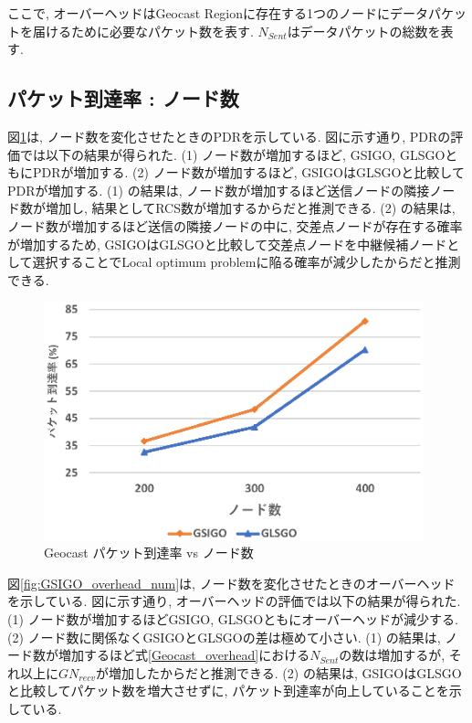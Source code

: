 \documentclass[10pt]{jreport}
\begin{document}
ここで, オーバーヘッドはGeocast Regionに存在する1つのノードにデータパケットを届けるために必要なパケット数を表す.
$N_{Sent}$はデータパケットの総数を表す. 

\subsection{パケット到達率 : ノード数}
図\ref{fig:GSIGO_PDR_num}は, ノード数を変化させたときのPDRを示している.
図に示す通り, PDRの評価では以下の結果が得られた.
(1) ノード数が増加するほど, GSIGO, GLSGOともにPDRが増加する. 
(2) ノード数が増加するほど, GSIGOはGLSGOと比較してPDRが増加する.
(1) の結果は, ノード数が増加するほど送信ノードの隣接ノード数が増加し, 結果としてRCS数が増加するからだと推測できる.
(2) の結果は, ノード数が増加するほど送信の隣接ノードの中に, 交差点ノードが存在する確率が増加するため, GSIGOはGLSGOと比較して交差点ノードを中継候補ノードとして選択することでLocal optimum problemに陥る確率が減少したからだと推測できる.


\begin{figure}[!ht]
	\centering
	\includegraphics[width=110mm]{figures/GSIGO_PDR_num.eps}
	\caption{Geocast パケット到達率 vs ノード数}
	\label{fig:GSIGO_PDR_num}
\end{figure}

図\ref{fig:GSIGO_overhead_num}は, ノード数を変化させたときのオーバーヘッドを示している.
図に示す通り, オーバーヘッドの評価では以下の結果が得られた.
(1) ノード数が増加するほどGSIGO, GLSGOともにオーバーヘッドが減少する.
(2) ノード数に関係なくGSIGOとGLSGOの差は極めて小さい.
(1) の結果は, ノード数が増加するほど式\ref{Geocast_overhead}における$N_{Sent}$の数は増加するが, それ以上に$GN_{recv}$が増加したからだと推測できる.
(2) の結果は, GSIGOはGLSGOと比較してパケット数を増大させずに, パケット到達率が向上していることを示している. 
\end{document}
